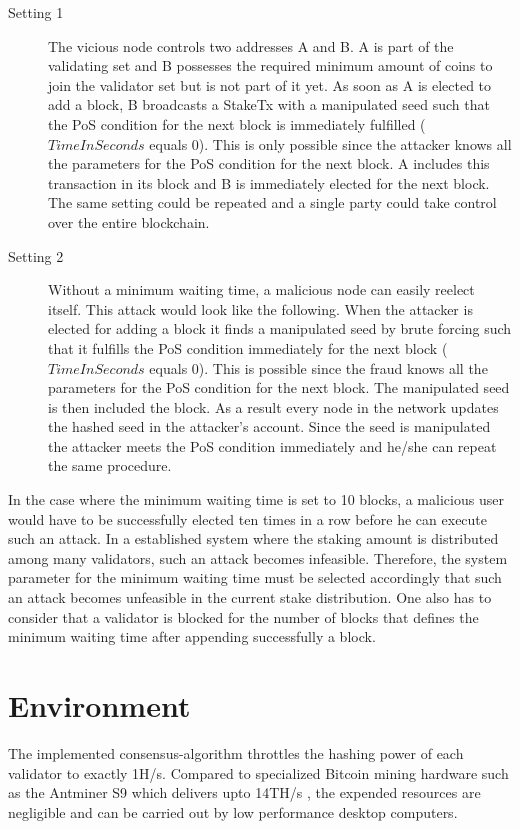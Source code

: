 \begin{description}
	\item[Setting 1] The vicious node controls two addresses A and B. A is part of the validating set and B possesses the required minimum amount of coins to join the validator set but is not part of it yet. As soon as A is elected to add a block, B broadcasts a StakeTx with a manipulated seed such that the PoS condition for the next block is immediately fulfilled ($ TimeInSeconds $ equals 0). This is only possible since the attacker knows all the parameters for the PoS condition for the next block. A includes this transaction in its block and B is immediately elected for the next block. The same setting could be repeated and a single party could take control over the entire blockchain.
	\item[Setting 2] Without a minimum waiting time, a malicious node can easily reelect itself. This attack would look like the following. When the attacker is elected for adding a block it finds a manipulated seed by brute forcing such that it fulfills the PoS condition immediately for the next block ($ TimeInSeconds $ equals 0). This is possible since the fraud knows all the parameters for the PoS condition for the next block. The manipulated seed is then included the block. As a result every node in the network updates the hashed seed in the attacker's account. Since the seed is manipulated the attacker meets the PoS condition immediately and he/she can repeat the same procedure.
\end{description}

In the case where the minimum waiting time is set to 10 blocks, a malicious user would have to be successfully elected ten times in a row before he can execute such an attack. In a established system where the staking amount is distributed among many validators, such an attack becomes infeasible.
Therefore, the system parameter for the minimum waiting time must be selected accordingly that such an attack becomes unfeasible in the current stake distribution. One also has to consider that a validator is blocked for the number of blocks that defines the minimum waiting time after appending successfully a block. 


\section{Environment}
The implemented consensus-algorithm throttles the hashing power of each validator to exactly 1H/s. Compared to specialized Bitcoin mining hardware such as the Antminer S9 which delivers upto 14TH/s \cite{antminer-s9}, the expended resources are negligible and can be carried out by low performance desktop computers.


